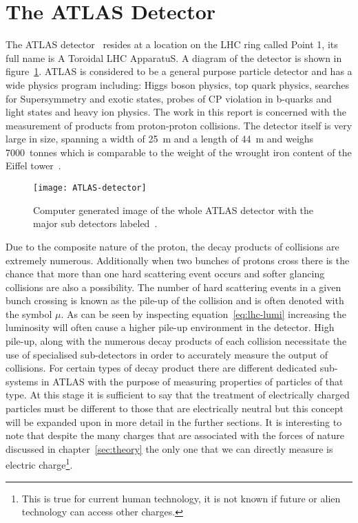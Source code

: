 \section{The ATLAS Detector}%
\label{sec:atlas}

The ATLAS detector~\cite{ATLAS} resides at a location on the LHC ring called
Point 1, its full name is A Toroidal LHC ApparatuS. A diagram of the detector is
shown in figure~\ref{fig:ATLAS-det}. ATLAS is considered to be a general purpose
particle detector and has a wide physics program including: Higgs boson physics,
top quark physics, searches for Supersymmetry and exotic states, probes of CP
violation in b-quarks and light states and heavy ion physics. The work in this
report is concerned with the measurement of products from proton-proton
collisions. The detector itself is very large in size, spanning a width of 25~m
and a length of 44~m and weighs 7000~tonnes which is comparable to the weight of
the wrought iron content of the Eiffel tower~\cite{Eiffel-weight}.
\begin{figure}[h]
  \centering
  \texttt{[image: ATLAS-detector]}
  \caption{Computer generated image of the whole ATLAS detector with the major sub detectors
    labeled~\cite{ATLAS-det-fig}.}%
  \label{fig:ATLAS-det}
\end{figure}


Due to the composite nature of the proton, the decay products of collisions are
extremely numerous. Additionally when two bunches of protons cross there is the
chance that more than one hard scattering event occurs and softer glancing
collisions are also a possibility. The number of hard scattering events in a
given bunch crossing is known as the pile-up of the collision and is often
denoted with the symbol $\mu$. As can be seen by inspecting
equation~\ref{eq:lhc-lumi} increasing the luminosity will often cause a higher
pile-up environment in the detector. High pile-up, along with the numerous decay
products of each collision necessitate the use of specialised sub-detectors in
order to accurately measure the output of collisions. For certain types of
decay product there are different dedicated sub-systems in ATLAS with the
purpose of measuring properties of particles of that type. At this stage it is
sufficient to say that the treatment of electrically charged particles must be
different to those that are electrically neutral but this concept will be
expanded upon in more detail in the further sections. It is interesting to note
that despite the many charges that are associated with the forces of nature
discussed in chapter~\ref{sec:theory} the only one that we can directly measure
is electric charge\footnote{This is true for current human technology, it is not
  known if future or alien technology can access other charges.}.

